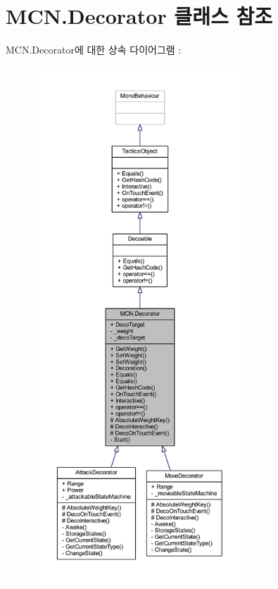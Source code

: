 \hypertarget{class_m_c_n_1_1_decorator}{}\section{M\+C\+N.\+Decorator 클래스 참조}
\label{class_m_c_n_1_1_decorator}


M\+C\+N.\+Decorator에 대한 상속 다이어그램 \+: 
\nopagebreak
\begin{figure}[H]
\begin{center}
\leavevmode
\includegraphics[height=550pt]{class_m_c_n_1_1_decorator__inherit__graph}
\end{center}
\end{figure}


